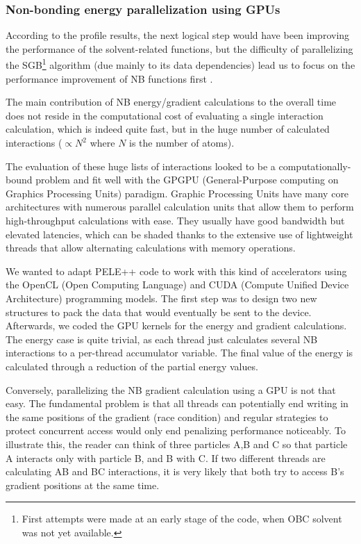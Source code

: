 \subsubsection[Non-bonding energy parallelization]{Non-bonding energy parallelization using GPUs}

According to the profile results, the next logical step would have been improving the performance of the solvent-related
functions, but the difficulty of parallelizing the SGB\footnote{First attempts were made at an early stage of the
code, when OBC solvent was not yet available. } algorithm (due mainly to its data dependencies) lead us to focus on
the performance improvement of NB functions first \cite{oro_gay_parallelitzacio_2012}.

The main contribution of NB energy/gradient calculations to the overall time does not reside in the computational cost
of evaluating a single interaction calculation, which is indeed quite fast, but in the huge number of calculated interactions ($\propto N^2$ where $N$ is the number of atoms). 

The evaluation of these huge lists of interactions looked to be a computationally-bound problem and fit well with the
GPGPU (General-Purpose computing on Graphics Processing Units) paradigm. Graphic Processing Units have many core
architectures with numerous parallel calculation units that allow them to perform high-throughput calculations with ease.
They usually have good bandwidth but elevated latencies, which can be shaded thanks to the extensive use of lightweight
threads that allow alternating calculations with memory operations. 

We wanted to adapt PELE++ code to work with this kind of accelerators using the OpenCL (Open Computing Language) and
CUDA (Compute Unified Device Architecture) programming models. The first step was to design two new structures to pack
the data that would eventually be sent to the device. Afterwards, we coded the GPU kernels for the energy and gradient
calculations. The energy case is quite trivial, as each thread just calculates several NB interactions to a
per-thread accumulator variable. The final value of the energy is calculated through a reduction of the partial energy
values. 

Conversely, parallelizing the NB gradient calculation using a GPU is not that easy. The fundamental problem is that all
threads can potentially end writing in the same positions of the gradient (race condition) and regular strategies to
protect concurrent access would only end penalizing performance noticeably. To illustrate this, the reader can think of
three particles A,B and C so that particle A interacts only with particle B, and B with C. If two different threads are
calculating AB and BC interactions, it is very likely that both try to access B's gradient positions at the same time. 

